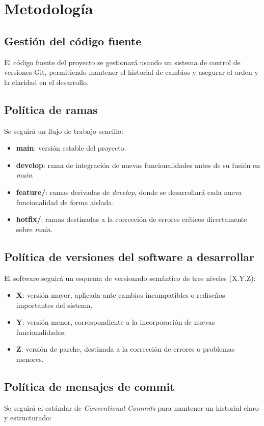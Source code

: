 \section{Metodología}

\subsection{Gestión del código fuente}
El código fuente del proyecto se gestionará usando un sistema de control de versiones Git, permitiendo mantener el historial de cambios y asegurar el orden y la claridad en el desarrollo.

\subsection{Política de ramas}
Se seguirá un flujo de trabajo sencillo:

\begin{itemize}
    \item \textbf{main}: versión estable del proyecto.
    \item \textbf{develop}: rama de integración de nuevas funcionalidades antes de su fusión en \textit{main}.
    \item \textbf{feature/}: ramas derivadas de \textit{develop}, donde se desarrollará cada nueva funcionalidad de forma aislada.
    \item \textbf{hotfix/}: ramas destinadas a la corrección de errores críticos directamente sobre \textit{main}.
\end{itemize}

\subsection{Política de versiones del software a desarrollar}
El software seguirá un esquema de versionado semántico de tres niveles (X.Y.Z):

\begin{itemize}
    \item \textbf{X}: versión mayor, aplicada ante cambios incompatibles o rediseños importantes del sistema.
    \item \textbf{Y}: versión menor, correspondiente a la incorporación de nuevas funcionalidades.
    \item \textbf{Z}: versión de parche, destinada a la corrección de errores o problemas menores.
\end{itemize}

\subsection{Política de mensajes de commit}
Se seguirá el estándar de \textit{Conventional Commits} para mantener un historial claro y estructurado:

